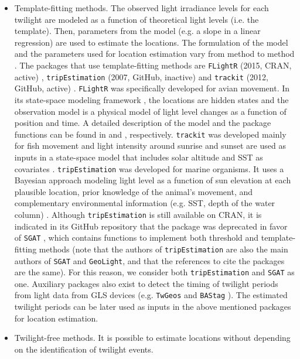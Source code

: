 \documentclass[a4paper,12pt]{article}
\newcommand{\Rpkg}[1]{\texttt{#1}}
\begin{document}
\begin{itemize}
		\item Template-fitting methods. The observed light irradiance levels for each twilight are modeled as a function of theoretical light levels (i.e. the template). Then, parameters from the model (e.g. a slope in a linear regression) are used to estimate the locations. The formulation of the model and the parameters used for location estimation vary from method to method \citep{Ekstrom2004}. The packages that use template-fitting methods are \Rpkg{FLightR} (2015, CRAN, active) \citep{RFLightR}, \Rpkg{tripEstimation} (2007, GitHub, inactive) \citep{Sumner2009,RtripEstimation} and \Rpkg{trackit} (2012, GitHub, active) \citep{Rtrackit}. \Rpkg{FLightR} was specifically developed for avian movement. In its state-space modeling framework \citep{Patterson2008}, the locations are hidden states and the observation model is a physical model of light level changes as a function of position and time. A detailed description of the model and the package functions can be found in \cite{Rakhimberdiev2015} and \cite{Rakhimberdiev2017}, respectively. \Rpkg{trackit} was developed mainly for fish movement and light intensity around sunrise and sunset are used as inputs in a state-space model that includes solar altitude and SST as covariates \citep{Lam2010}. \Rpkg{tripEstimation} was developed for marine organisms. It uses a Bayesian approach modeling light level as a function of sun elevation at each plausible location, prior knowledge of the animal's movement, and complementary environmental information (e.g. SST, depth of the water column) \citep{Sumner2009}. Although \Rpkg{tripEstimation} is still available on CRAN, it is indicated in its GitHub repository that the package was deprecated in favor of \Rpkg{SGAT} \citep{Sumner2009,Lisovski2012}, which contains functions to implement both threshold and template-fitting methods (note that the authors of \Rpkg{tripEstimation} are also the main authors of \Rpkg{SGAT} and \Rpkg{GeoLight}, and that the references to cite the packages are the same). For this reason, we consider both \Rpkg{tripEstimation} and \Rpkg{SGAT} as one. Auxiliary packages also exist to detect the timing of twilight periods from light data from GLS devices (e.g. \Rpkg{TwGeos} \citep{RTwGeos} and \Rpkg{BAStag} \citep{RBAStag}). The estimated twilight periods can be later used as inputs in the above mentioned packages for location estimation.
		\item Twilight-free methods. It is possible to estimate locations without depending on the identification of twilight events. %

\end{itemize}
\end{document}
